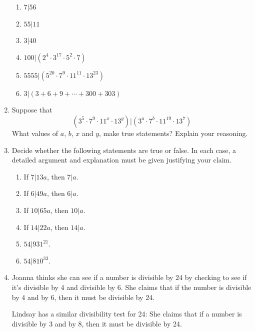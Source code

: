 \begin{problems}
\begin{enumerate}
\begin{enumerate}
\item $7|56$
\item $55|11$
\item $3|40$
\item $100 | (2^4\cdot 3^{17} \cdot 5^2\cdot 7)$
\item $5555 | (5^{20}\cdot 7^9\cdot 11^{11}\cdot 13^{23})$ 
\item $3| (3+ 6 + 9 + \cdots +300 + 303)$
\end{enumerate}
\item Suppose that 
\[
(3^5 \cdot 7^9 \cdot 11^x \cdot 13^y) | (3^a \cdot 7^b \cdot 11^{19} \cdot 13^7)
\]
What values of $a$, $b$, $x$ and $y$, make true statements? Explain
your reasoning.
\item Decide whether the following statements are true or false. In
  each case, a detailed argument and explanation must be given
  justifying your claim.
\begin{enumerate}
\item If $7|13a$, then $7|a$.
\item If $6|49a$, then $6|a$. 
\item If $10|65a$, then $10|a$.
\item If $14|22a$, then $14|a$.
\item $54|931^{21}$.
\item $54|810^{33}$.
\end{enumerate}
\item Joanna thinks she can see if a number is divisible by 24 by
  checking to see if it's divisible by 4 and divisible by 6.  She
  claims that if the number is divisible by 4 and by 6, then it must
  be divisible by 24.

Lindsay has a similar divisibility test for 24: She claims that if a
number is divisible by 3 and by 8, then it must be divisible by 24.


\end{enumerate}
\end{problems}
